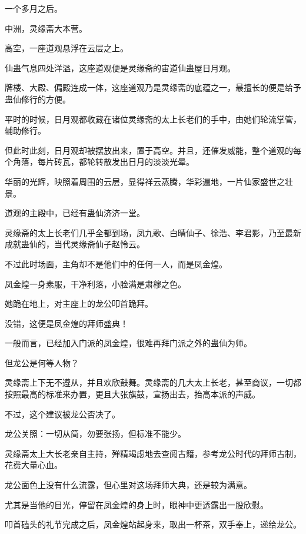 
\begin{this_body}



一个多月之后。

中洲，灵缘斋大本营。

高空，一座道观悬浮在云层之上。

仙蛊气息四处洋溢，这座道观便是灵缘斋的宙道仙蛊屋日月观。

牌楼、大殿、偏殿连成一体，这座道观乃是灵缘斋的底蕴之一，最擅长的便是给予蛊仙修行的方便。

平时的时候，日月观都收藏在诸位灵缘斋的太上长老们的手中，由她们轮流掌管，辅助修行。

但此时此刻，日月观却被摆放出来，置于高空。并且，还催发威能，整个道观的每个角落，每片砖瓦，都轮转散发出日月的淡淡光晕。

华丽的光辉，映照着周围的云层，显得祥云蒸腾，华彩遍地，一片仙家盛世之壮景。

道观的主殿中，已经有蛊仙济济一堂。

灵缘斋的太上长老们几乎全都到场，凤九歌、白晴仙子、徐浩、李君影，乃至最新成就蛊仙的，当代灵缘斋仙子赵怜云。

不过此时场面，主角却不是他们中的任何一人，而是凤金煌。

凤金煌一身素服，干净利落，小脸满是肃穆之色。

她跪在地上，对主座上的龙公叩首跪拜。

没错，这便是凤金煌的拜师盛典！

一般而言，已经加入门派的凤金煌，很难再拜门派之外的蛊仙为师。

但龙公是何等人物？

灵缘斋上下无不遵从，并且欢欣鼓舞。灵缘斋的几大太上长老，甚至商议，一切都按照最高的标准来办置，更且大张旗鼓，宣扬出去，抬高本派的声威。

不过，这个建议被龙公否决了。

龙公关照：一切从简，勿要张扬，但标准不能少。

灵缘斋太上大长老亲自主持，殚精竭虑地去查阅古籍，参考龙公时代的拜师古制，花费大量心血。

龙公面色上没有什么流露，但心里对这场拜师大典，还是较为满意。

尤其是当他的目光，停留在凤金煌的身上时，眼神中更透露出一股欣慰。

叩首磕头的礼节完成之后，凤金煌站起身来，取出一杯茶，双手奉上，递给龙公。


\end{this_body}
